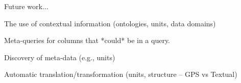 Future work...

\begin{itemize*}
  \item The use of contextual information (ontologies, units, data domains)
  \item Meta-queries for columns that *could* be in a query.
  \item Discovery of meta-data (e.g., units)
  \item Automatic translation/transformation (units, structure -- GPS vs Textual)
\end{itemize*}